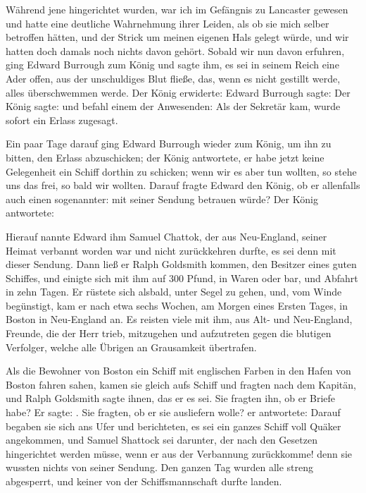 Während jene hingerichtet wurden, war ich im
Gefängnis zu Lancaster gewesen und hatte eine deutliche Wahrnehmung 
ihrer Leiden, als ob sie mich selber betroffen hätten,
und der Strick um meinen eigenen Hals gelegt würde, und wir
hatten doch damals noch nichts davon gehört. Sobald wir nun
davon erfuhren, ging Edward Burrough 
zum König und sagte
ihm, es sei in seinem Reich eine Ader offen, aus der unschuldiges
Blut fließe, das, wenn es nicht gestillt werde, alles überschwemmen
werde. Der König erwiderte: 
Edward Burrough sagte:  Der König
sagte:  und befahl einem der Anwesenden:
 Als der Sekretär
kam, wurde sofort ein Erlass zugesagt. 

Ein paar Tage darauf
ging Edward Burrough wieder zum König, um ihn zu bitten,
den Erlass abzuschicken; der König antwortete, er habe jetzt keine
Gelegenheit ein Schiff dorthin zu schicken; wenn wir es aber tun
wollten, so stehe uns das frei, so bald wir wollten. Darauf fragte
Edward den König, ob er allenfalls auch einen sogenannter:
 mit seiner Sendung betrauen würde? Der König 
antwortete:  


Hierauf nannte 
Edward ihm Samuel Chattok, der aus 
Neu-England, seiner Heimat
verbannt worden war und nicht zurückkehren durfte, es sei denn
mit dieser Sendung. Dann ließ er Ralph 
Goldsmith kommen,
den Besitzer eines guten Schiffes, und einigte sich mit ihm auf
300 Pfund, in Waren oder bar, und Abfahrt in zehn Tagen. Er
rüstete sich alsbald, unter Segel zu gehen, und, vom Winde 
begünstigt, kam er nach etwa sechs Wochen, am Morgen eines
Ersten Tages, in Boston in Neu-England an. 
Es reisten viele mit ihm, aus Alt- und Neu-England, 
Freunde, die der Herr
trieb, mitzugehen und aufzutreten gegen die blutigen Verfolger,
welche alle Übrigen an Grausamkeit übertrafen.


Als die Bewohner von Boston ein Schiff mit englischen
Farben in den Hafen von Boston fahren sahen, kamen sie
gleich aufs Schiff und fragten nach dem Kapitän, und Ralph
Goldsmith sagte ihnen, das er es sei. Sie fragten ihn, ob er
Briefe habe? Er sagte: . Sie fragten, ob er sie 
ausliefern wolle? er antwortete:  
Darauf begaben sie sich ans Ufer und berichteten, es sei 
ein ganzes Schiff voll Quäker angekommen, und Samuel Shattock 
sei darunter, der nach den Gesetzen hingerichtet werden müsse, 
wenn er aus der Verbannung zurückkomme! denn sie wussten nichts 
von seiner Sendung. Den ganzen Tag wurden alle streng abgesperrt, 
und keiner von der Schiffsmannschaft durfte landen. 

